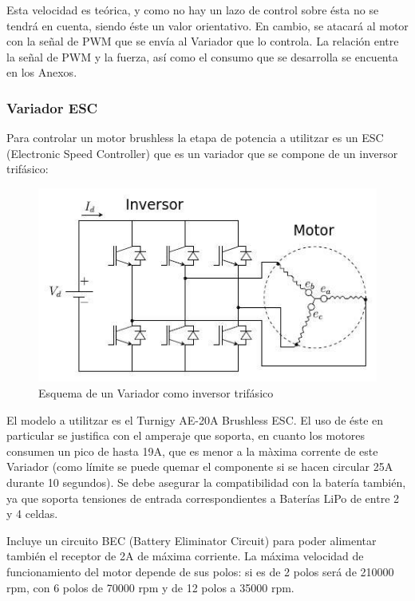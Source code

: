 \documentclass[twoside,11pt]{book}
\begin{document}
Esta velocidad es teórica, y como no hay un lazo de control sobre ésta no se tendrá en cuenta, siendo éste un valor orientativo. En cambio, se atacará al motor con la señal de PWM que se envía al Variador que lo controla. La relación entre la señal de PWM y la fuerza, así como el consumo que se desarrolla se encuenta en los Anexos. 

\subsubsection*{Variador ESC}


Para controlar un motor brushless la etapa de potencia a utilitzar es un ESC (Electronic Speed Controller) que es un  variador que se compone de un inversor trifásico:
\begin{figure}[h!]
\begin{center}
\includegraphics[scale=0.5,bb=0 0 420 200]{images/ESC.png}
\caption{Esquema de un Variador como inversor trifásico}
\end{center}
\end{figure}
El modelo a utilitzar es el Turnigy AE-20A Brushless ESC. El uso de éste en particular se justifica con el amperaje que soporta, en cuanto los motores consumen un pico de hasta 19A, que es menor a la màxima corrente de este Variador (como límite se puede quemar el componente si se hacen circular 25A durante 10 segundos). 
Se debe asegurar la compatibilidad con la batería también, ya que soporta tensiones de entrada correspondientes a Baterías LiPo de entre 2 y 4 celdas. 

Incluye un circuito BEC (Battery Eliminator Circuit) para poder alimentar también el receptor de 2A de máxima corriente. 
La máxima velocidad de funcionamiento del motor depende de sus polos: si es de 2 polos será de 210000 rpm, con 6 polos de 70000 rpm y de 12 polos a 35000 rpm.
\end{document}
